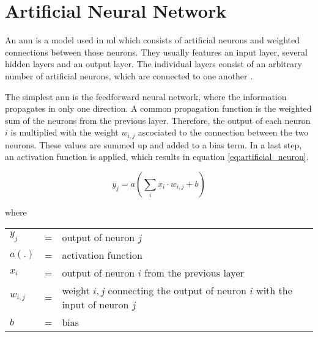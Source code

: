 \section{Artificial Neural Network}
\label{sec:theoretical_background:ann}

An \acrlong{ann} is a model used in \acrshort{ml} which consists of artificial neurons and weighted connections between those neurons.
They usually features an input layer, several hidden layers and an output layer.
The individual layers consist of an arbitrary number of artificial neurons, which are connected to one another \cite[p.~33-36]{nn}.

The simplest \acrshort{ann} is the feedforward neural network, where the information propagates in only one direction.
A common propagation function is the weighted sum of the neurons from the previous layer.
Therefore, the output of each neuron $i$ is multiplied with the weight $w_{i, j}$ ascociated to the connection between the two neurons.
These values are summed up and added to a bias term.
In a last step, an activation function is applied, which results in equation \ref{eq:artificial_neuron}.

\begin{equation}
  y_j = a\left(\sum\limits_{i} x_i \cdot w_{i, j} + b\right)
  \label{eq:artificial_neuron}
\end{equation}

where

\begin{tabular}{lll}
  $y_j$ & = & output of neuron $j$ \\
  $a(.)$ & = & activation function \\
  $x_i$ & = & output of neuron $i$ from the previous layer \\
  $w_{i, j}$ & = & weight $i, j$ connecting the output of neuron $i$ with the input of neuron $j$ \\
  $b$ & = & bias \\
\end{tabular}
\\

